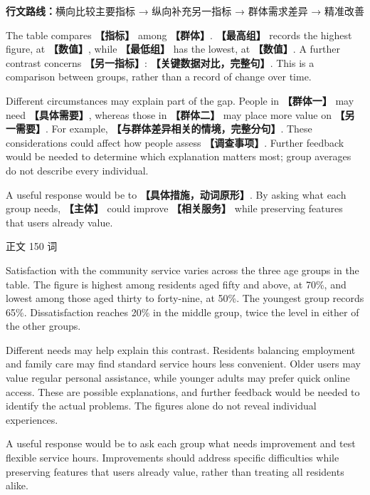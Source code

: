 \documentclass[11pt,a4paper,fontset=macnew]{ctexart}
\newenvironment{writing}{\begingroup\fontsize{10.5}{13.5}\selectfont\setlength{\parskip}{3pt}}{\par\endgroup}
\newenvironment{example}{\begingroup\fontsize{11}{14.3}\selectfont\setlength{\parskip}{4pt}}{\par\endgroup}
\begin{document}
{\small\textbf{行文路线：}横向比较主要指标 → 纵向补充另一指标 → 群体需求差异 → 精准改善}\par
\par\vspace{4pt}{\bfseries 可替换模板}\par\nopagebreak
\begin{writing}
The table compares {\bfseries 【指标】} among {\bfseries 【群体】}. {\bfseries 【最高组】} records the highest figure, at {\bfseries 【数值】}, while {\bfseries 【最低组】} has the lowest, at {\bfseries 【数值】}. A further contrast concerns {\bfseries 【另一指标】}: {\bfseries 【关键数据对比，完整句】}. This is a comparison between groups, rather than a record of change over time.

Different circumstances may explain part of the gap. People in {\bfseries 【群体一】} may need {\bfseries 【具体需要】}, whereas those in {\bfseries 【群体二】} may place more value on {\bfseries 【另一需要】}. For example, {\bfseries 【与群体差异相关的情境，完整分句】}. These considerations could affect how people assess {\bfseries 【调查事项】}. Further feedback would be needed to determine which explanation matters most; group averages do not describe every individual.

A useful response would be to {\bfseries 【具体措施，动词原形】}. By asking what each group needs, {\bfseries 【主体】} could improve {\bfseries 【相关服务】} while preserving features that users already value.

\end{writing}
\par\vspace{4pt}{\bfseries 完整套用示例}\par\nopagebreak
{\small 正文 150 词}\par
\begin{example}
Satisfaction with the community service varies across the three age groups in the table. The figure is highest among residents aged fifty and above, at 70\%, and lowest among those aged thirty to forty-nine, at 50\%. The youngest group records 65\%. Dissatisfaction reaches 20\% in the middle group, twice the level in either of the other groups.

Different needs may help explain this contrast. Residents balancing employment and family care may find standard service hours less convenient. Older users may value regular personal assistance, while younger adults may prefer quick online access. These are possible explanations, and further feedback would be needed to identify the actual problems. The figures alone do not reveal individual experiences.

A useful response would be to ask each group what needs improvement and test flexible service hours. Improvements should address specific difficulties while preserving features that users already value, rather than treating all residents alike.

\end{example}
\end{document}
